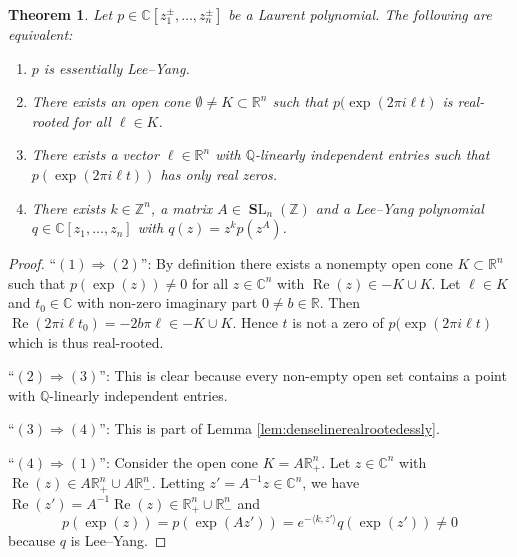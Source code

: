 \documentclass[11pt,letterpaper]{amsart}
\theoremstyle{definition}
\theoremstyle{plain}
\newtheorem{thm}[Def]{Theorem}
\newcommand{\Rea}{\operatorname{Re}}
\newcommand{\SL}{\operatorname{{\mathbf SL}}}
\newcommand{\C}{{\mathbb C}}
\newcommand{\R}{{\mathbb R}}
\newcommand{\Q}{{\mathbb Q}}
\newcommand{\Z}{{\mathbb Z}}
\begin{document}
\begin{thm}\label{thm:essleeyangchara}
    Let $p\in\C[z_1^{\pm},\ldots,z_n^{\pm}]$ be a Laurent polynomial. The following are equivalent:
    \begin{enumerate}
        \item $p$ is essentially Lee--Yang.
        \item There exists an open cone $\emptyset\neq K\subset\R^n$ such that $p(\exp(2\pi i\ell t)$ is real-rooted for all $\ell\in K$.
        \item There exists a vector $\ell\in\R^n$ with $\Q$-linearly independent entries such that $p(\exp(2\pi i\ell t))$ has only real zeros.
        \item There exists $k\in\Z^n$, a matrix $A\in\SL_n(\Z)$ and a Lee--Yang polynomial $q\in\C[z_1,\ldots,z_n]$ with $q(z)=z^kp(z^A)$.
    \end{enumerate}
\end{thm}
\begin{proof}
    ``$(1)\Rightarrow(2)$'': By definition there exists a nonempty open cone $K\subset\R^n$ such that $p(\exp(z))\neq0$ for all $z\in\C^n$ with $\Rea(z)\in -K\cup K$. Let $\ell\in K$ and $t_0\in\C$ with non-zero imaginary part $0\neq b\in\R$. Then $\Rea(2\pi i\ell t_0)=-2b\pi \ell\in -K\cup K$. Hence $t$ is not a zero of $p(\exp(2\pi i\ell t)$ which is thus real-rooted.

    ``$(2)\Rightarrow(3)$'': This is clear because every non-empty open set contains a point with $\Q$-linearly independent entries.

    ``$(3)\Rightarrow(4)$'': This is part of Lemma \ref{lem:denselinerealrootedessly}.

    ``$(4)\Rightarrow(1)$'':  Consider the open cone $K=A\R_{+
    }^n$. Let $z\in\C^n$ with $\Rea(z)\in A\R_{+
    }^n\cup A\R_{-
    }^n$. Letting $z'=A^{-1}z\in\C^n$, we have $\Rea(z')=A^{-1}\Rea(z)\in \R_{+
    }^n\cup \R_{-
    }^n$ and
    \begin{equation*}
        p(\exp(z))=p(\exp(Az'))=e^{-\langle  k,z'\rangle}q(\exp(z'))\neq0
    \end{equation*}
    because $q$ is Lee--Yang.
\end{proof}
\end{document}
